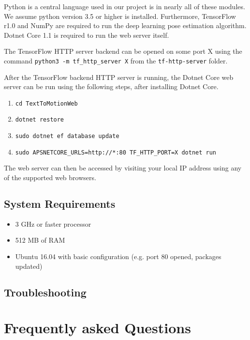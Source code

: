 \documentclass{scrreprt}
\begin{document}
Python is a central language used in our project is in nearly all of these
modules.  We assume python version 3.5 or higher is installed. Furthermore,
TensorFlow r1.0 and NumPy are required to run the deep learning pose estimation
algorithm.  Dotnet Core 1.1 is required to run the web server itself.

The TensorFlow HTTP server backend can be opened on some port X using the
command \verb|python3 -m tf_http_server X| from the \verb|tf-http-server|
folder.

After the TensorFlow backend HTTP server is running, the Dotnet Core web server
can be run using the following steps, after installing Dotnet Core.

\begin{enumerate}
        \item \verb|cd TextToMotionWeb|
        \item \verb|dotnet restore|
        \item \verb|sudo dotnet ef database update|
        \item \verb|sudo APSNETCORE_URLS=http://*:80 TF_HTTP_PORT=X dotnet run|
\end{enumerate}

The web server can then be accessed by visiting your local IP address using any
of the supported web browsers.

\subsection{System Requirements}

\begin{itemize}
\item 3 GHz or faster processor
\item 512 MB of RAM
\item Ubuntu 16.04 with basic configuration (e.g. port 80 opened, packages updated)
\end{itemize}


\subsection{Troubleshooting}

\section{Frequently asked Questions}
\end{document}
